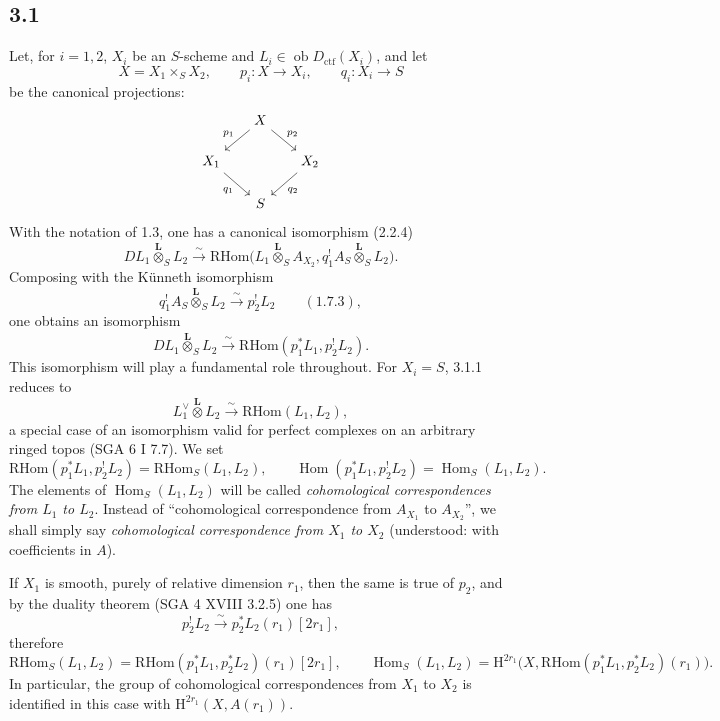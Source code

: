\documentclass[11pt]{article}
\renewcommand{\H}{\mathrm{H}}
\DeclareMathOperator{\Hom}{Hom}
\newcommand{\ob}{\operatorname{ob}}
\providecommand{\RHom}{\mathrm{RHom}}
\providecommand{\Dctf}{D_{\mathrm{ctf}}}
\providecommand{\Dctf}{D_{\mathrm{ctf}}}
\providecommand{\RHom}{\mathrm{RHom}}
\providecommand{\Hom}{\operatorname{Hom}}
\providecommand{\ob}{\operatorname{ob}}
\providecommand{\RHom}{\mathrm R\mathcal{H}om}
\providecommand{\RHom}{\mathrm{RHom}}
\begin{document}
\subsection*{3.1}
Let, for $i=1,2$, $X_i$ be an $S$-scheme and $L_i\in\ob\Dctf(X_i)$, and let
\[
X=X_1\times_S X_2,
\qquad
p_i:X\longrightarrow X_i,
\qquad
q_i:X_i\longrightarrow S
\]
be the canonical projections:
\[
\begin{tikzcd}[column sep=1.6em,row sep=1.5em]
& X \arrow[dl,"p_1"'] \arrow[dr,"p_2"] & \\
X_1 \arrow[dr,"q_1"'] & & X_2 \arrow[dl,"q_2"] \\
& S &
\end{tikzcd}
\]
With the notation of 1.3, one has a canonical isomorphism (2.2.4)
\[
DL_1\overset{\mathbf L}{\otimes}_S L_2
\xrightarrow{\sim}
\RHom\bigl(L_1\overset{\mathbf L}{\otimes}_S A_{X_2},
q_1^!A_S\overset{\mathbf L}{\otimes}_S L_2\bigr).
\]
Composing with the Künneth isomorphism
\[
q_1^!A_S\overset{\mathbf L}{\otimes}_S L_2
\xrightarrow{\sim}p_2^!L_2 \qquad (1.7.3),
\]
one obtains an isomorphism
\begin{equation}
DL_1\overset{\mathbf L}{\otimes}_S L_2
\xrightarrow{\sim}
\RHom(p_1^*L_1,p_2^!L_2).
\tag{3.1.1}
\end{equation}
This isomorphism will play a fundamental role throughout. For $X_i=S$, 3.1.1 reduces to
\[
L_1^\vee\overset{\mathbf L}{\otimes}L_2\xrightarrow{\sim}\RHom(L_1,L_2),
\]
a special case of an isomorphism valid for perfect complexes on an arbitrary ringed topos (SGA 6 I 7.7). We set
\begin{equation}
\RHom(p_1^*L_1,p_2^!L_2)=\RHom_S(L_1,L_2),
\qquad
\Hom(p_1^*L_1,p_2^!L_2)=\Hom_S(L_1,L_2).
\tag{3.1.2}
\end{equation}
The elements of $\Hom_S(L_1,L_2)$ will be called \emph{cohomological correspondences from $L_1$ to $L_2$}. Instead of ``cohomological correspondence from $A_{X_1}$ to $A_{X_2}$'', we shall simply say \emph{cohomological correspondence from $X_1$ to $X_2$} (understood: with coefficients in $A$).

If $X_1$ is smooth, purely of relative dimension $r_1$, then the same is true of $p_2$, and by the duality theorem (SGA 4 XVIII 3.2.5) one has
\[
p_2^!L_2\xrightarrow{\sim}p_2^*L_2(r_1)[2r_1],
\]
therefore
\begin{equation}
\RHom_S(L_1,L_2)=\RHom(p_1^*L_1,p_2^*L_2)(r_1)[2r_1],
\qquad
\Hom_S(L_1,L_2)=\H^{2r_1}\bigl(X,\RHom(p_1^*L_1,p_2^*L_2)(r_1)\bigr).
\tag{3.1.3}
\end{equation}
In particular, the group of cohomological correspondences from $X_1$ to $X_2$ is identified in this case with $\H^{2r_1}(X,A(r_1))$.
\end{document}
